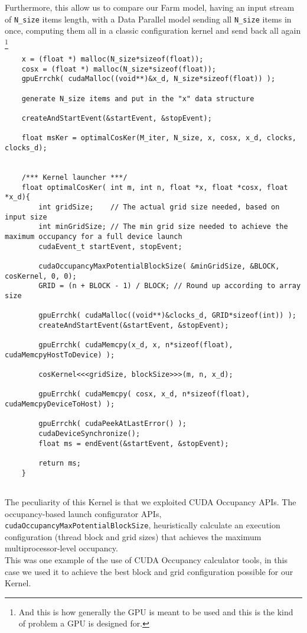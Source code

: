 	Furthermore, this allow us to compare our Farm model, having an input stream of \texttt{N\_size} items length, with a Data Parallel model sending all \texttt{N\_size} items in once, computing them all in a classic configuration kernel and send back all again \footnote{And this is how generally the GPU is meant to be used and this is the kind of problem a GPU is designed for.}
	\begin{lstlisting}
	x = (float *) malloc(N_size*sizeof(float));
	cosx = (float *) malloc(N_size*sizeof(float));
	gpuErrchk( cudaMalloc((void**)&x_d, N_size*sizeof(float)) );
	
	generate N_size items and put in the "x" data structure
	
	createAndStartEvent(&startEvent, &stopEvent);
	
	float msKer = optimalCosKer(M_iter, N_size, x, cosx, x_d, clocks, clocks_d); 	
	
	
	/*** Kernel launcher ***/
	float optimalCosKer( int m, int n, float *x, float *cosx, float *x_d){
		int gridSize;    // The actual grid size needed, based on input size 
		int minGridSize; // The min grid size needed to achieve the maximum occupancy for a full device launch 
		cudaEvent_t startEvent, stopEvent;
		
		cudaOccupancyMaxPotentialBlockSize( &minGridSize, &BLOCK, cosKernel, 0, 0); 
		GRID = (n + BLOCK - 1) / BLOCK; // Round up according to array size 

		gpuErrchk( cudaMalloc((void**)&clocks_d, GRID*sizeof(int)) );  		
		createAndStartEvent(&startEvent, &stopEvent); 
		  
		gpuErrchk( cudaMemcpy(x_d, x, n*sizeof(float), cudaMemcpyHostToDevice) ); 
		
		cosKernel<<<gridSize, blockSize>>>(m, n, x_d);
		
		gpuErrchk( cudaMemcpy( cosx, x_d, n*sizeof(float), cudaMemcpyDeviceToHost) );
	
		gpuErrchk( cudaPeekAtLastError() );		
		cudaDeviceSynchronize();		
		float ms = endEvent(&startEvent, &stopEvent);
	
		return ms;	
	}
		
	\end{lstlisting}
	The peculiarity of this Kernel is that we exploited CUDA Occupancy APIs.
	The occupancy-based launch configurator APIs,
	\texttt{cudaOccupancyMaxPotentialBlockSize}, heuristically calculate an execution configuration (thread block and grid sizes) that achieves the maximum multiprocessor-level occupancy.\\
	This was one example of the use of CUDA Occupancy calculator tools, in this case we used it to achieve the best block and grid configuration possible for our Kernel.
	
